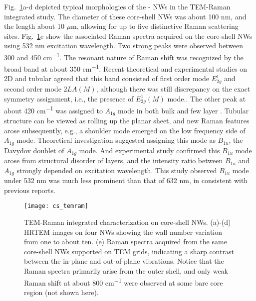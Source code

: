 Fig.~\ref{fig:ch5ws2ram}a-d depicted typical morphologies of the - NWs in the TEM-Raman integrated study. The diameter of these core-shell NWs was about 100 nm, and the length about 10 $\mu$m, allowing for up to five distinctive Raman scattering sites. Fig.~\ref{fig:ch5ws2ram}e show the associated Raman spectra acquired on the core-shell NWs using 532 nm excitation wavelength. Two strong peaks were observed between 300 and 450 \si{cm^{-1}}. The resonant nature\cite{Stacy1985} of Raman shift was recognized by the broad band at about 350 \si{cm^{-1}}.  Recent theoretical\cite{Molina-Sanchez2011} and experimental\cite{Staiger2012} studies on 2D and tubular  agreed that this band consisted of first order mode $E_{2g}^1$ and second order mode $2LA(M)$, although there was still discrepancy on the exact symmetry assignment, i.e., the presence of $E_{2g}^1(M)$ mode.\cite{Berkdemir2013,Peimyoo2013}. The other peak at about 420 \si{cm^{-1}} was assigned to $A_{1g}$ mode in both bulk\cite{Sekine1980} and few layer . Tubular  structure can be viewed as rolling up the planar  sheet, and new Raman features arose subsequently, e.g., a shoulder mode emerged on the low frequency side of $A_{1g}$ mode. Theoretical investigation suggested assigning this mode as $B_{1u}$, the Davydov doublet of $A_{1g}$ mode.\cite{Ataca2012} And experimental study confirmed this $B_{1u}$ mode arose from structural disorder of  layers, and the intensity ratio between $B_{1u}$ and $A_{1g}$ strongly depended on excitation wavelength.\cite{Staiger2012} This study observed $B_{1u}$ mode under 532 nm was much less prominent than that of 632 nm, in consistent with previous reports.\cite{Krause2009,Krause2009a} 
\begin{figure}[htb]
\centering
\texttt{[image: cs\_temram]}
\caption[TEM-Raman integrated characterization on core-shell NWs]{TEM-Raman integrated characterization on core-shell NWs. (a)-(d) HRTEM images on four NWs showing the  wall number variation from one to about ten. (e) Raman spectra acquired from the same core-shell NWs supported on TEM grids, indicating a sharp contrast between the in-plane and out-of-plane vibrations. Notice that the Raman spectra primarily arise from the outer  shell, and only weak Raman shift at about 800 \si{cm^{-1}} were observed at some bare core region (not shown here).}
\label{fig:ch5ws2ram}
\end{figure}

